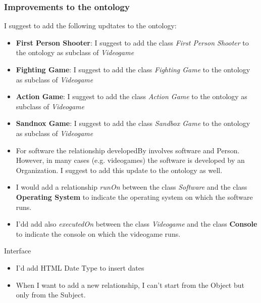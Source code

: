 \subsubsection{Improvements to the ontology}
I suggest to add the following updtates to the ontology:
\begin{itemize}
    \item \textbf{First Person Shooter}: I suggest to add the class \textit{First Person Shooter} to the ontology as subclass of \textit{Videogame}
    \item \textbf{Fighting Game}: I suggest to add the class \textit{Fighting Game} to the ontology as subclass of \textit{Videogame}
    \item \textbf{Action Game}: I suggest to add the class \textit{Action Game} to the ontology as subclass of \textit{Videogame}
    \item \textbf{Sandnox Game}: I suggest to add the class \textit{Sandbox Game} to the ontology as subclass of \textit{Videogame}
    \item For software the relationship developedBy involves software and Person. However, in many cases (e.g. videogames) the software is developed by an Organization. I suggest to add this update to the ontology as well.
    \item I would add a relationship \textit{runOn} between the class \textit{Software} and the class \textbf{Operating System} to indicate the operating system on which the software runs.
    \item I'dd add also \textit{executedOn} between the class \textit{Videogame} and the class \textbf{Console} to indicate the console on which the videogame runs.
\end{itemize}


Interface
\begin{itemize}
    \item I'd add HTML Date Type to insert dates
    \item When I want to add a new relationship, I can't start from the Object but only from the Subject.
\end{itemize}